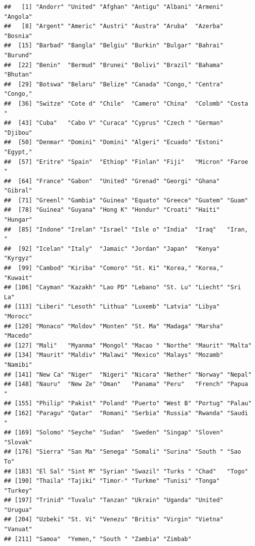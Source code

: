 \documentclass[12pt,oneside,openany]{book}
\newenvironment{Shaded}{\begin{snugshade}}{\end{snugshade}}
\newcommand{\KeywordTok}[1]{\textcolor[rgb]{0.13,0.29,0.53}{\textbf{{#1}}}}
\newcommand{\DataTypeTok}[1]{\textcolor[rgb]{0.13,0.29,0.53}{{#1}}}
\newcommand{\DecValTok}[1]{\textcolor[rgb]{0.00,0.00,0.81}{{#1}}}
\newcommand{\StringTok}[1]{\textcolor[rgb]{0.31,0.60,0.02}{{#1}}}
\newcommand{\NormalTok}[1]{{#1}}
\begin{document}
\begin{Shaded}
\end{Shaded}

\begin{verbatim}
##   [1] "Andorr" "United" "Afghan" "Antigu" "Albani" "Armeni" "Angola"
##   [8] "Argent" "Americ" "Austri" "Austra" "Aruba"  "Azerba" "Bosnia"
##  [15] "Barbad" "Bangla" "Belgiu" "Burkin" "Bulgar" "Bahrai" "Burund"
##  [22] "Benin"  "Bermud" "Brunei" "Bolivi" "Brazil" "Bahama" "Bhutan"
##  [29] "Botswa" "Belaru" "Belize" "Canada" "Congo," "Centra" "Congo,"
##  [36] "Switze" "Cote d" "Chile"  "Camero" "China"  "Colomb" "Costa "
##  [43] "Cuba"   "Cabo V" "Curaca" "Cyprus" "Czech " "German" "Djibou"
##  [50] "Denmar" "Domini" "Domini" "Algeri" "Ecuado" "Estoni" "Egypt,"
##  [57] "Eritre" "Spain"  "Ethiop" "Finlan" "Fiji"   "Micron" "Faroe "
##  [64] "France" "Gabon"  "United" "Grenad" "Georgi" "Ghana"  "Gibral"
##  [71] "Greenl" "Gambia" "Guinea" "Equato" "Greece" "Guatem" "Guam"  
##  [78] "Guinea" "Guyana" "Hong K" "Hondur" "Croati" "Haiti"  "Hungar"
##  [85] "Indone" "Irelan" "Israel" "Isle o" "India"  "Iraq"   "Iran, "
##  [92] "Icelan" "Italy"  "Jamaic" "Jordan" "Japan"  "Kenya"  "Kyrgyz"
##  [99] "Cambod" "Kiriba" "Comoro" "St. Ki" "Korea," "Korea," "Kuwait"
## [106] "Cayman" "Kazakh" "Lao PD" "Lebano" "St. Lu" "Liecht" "Sri La"
## [113] "Liberi" "Lesoth" "Lithua" "Luxemb" "Latvia" "Libya"  "Morocc"
## [120] "Monaco" "Moldov" "Monten" "St. Ma" "Madaga" "Marsha" "Macedo"
## [127] "Mali"   "Myanma" "Mongol" "Macao " "Northe" "Maurit" "Malta" 
## [134] "Maurit" "Maldiv" "Malawi" "Mexico" "Malays" "Mozamb" "Namibi"
## [141] "New Ca" "Niger"  "Nigeri" "Nicara" "Nether" "Norway" "Nepal" 
## [148] "Nauru"  "New Ze" "Oman"   "Panama" "Peru"   "French" "Papua "
## [155] "Philip" "Pakist" "Poland" "Puerto" "West B" "Portug" "Palau" 
## [162] "Paragu" "Qatar"  "Romani" "Serbia" "Russia" "Rwanda" "Saudi "
## [169] "Solomo" "Seyche" "Sudan"  "Sweden" "Singap" "Sloven" "Slovak"
## [176] "Sierra" "San Ma" "Senega" "Somali" "Surina" "South " "Sao To"
## [183] "El Sal" "Sint M" "Syrian" "Swazil" "Turks " "Chad"   "Togo"  
## [190] "Thaila" "Tajiki" "Timor-" "Turkme" "Tunisi" "Tonga"  "Turkey"
## [197] "Trinid" "Tuvalu" "Tanzan" "Ukrain" "Uganda" "United" "Urugua"
## [204] "Uzbeki" "St. Vi" "Venezu" "Britis" "Virgin" "Vietna" "Vanuat"
## [211] "Samoa"  "Yemen," "South " "Zambia" "Zimbab"
\end{verbatim}
\end{document}
